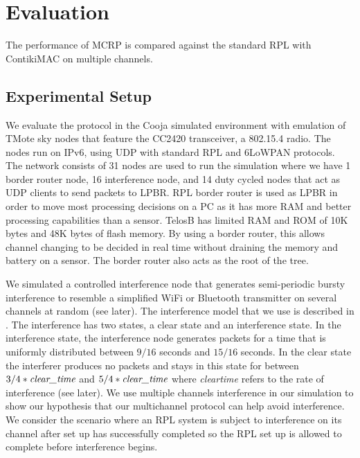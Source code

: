 \section{Evaluation}
\label{sec:evaluation}
The performance of MCRP is compared against the standard RPL with ContikiMAC on multiple channels.

\subsection{Experimental Setup}
We evaluate the protocol in the  Cooja simulated environment with emulation of TMote sky nodes that feature the CC2420 transceiver, a 802.15.4 radio. The nodes run on IPv6, using UDP with standard RPL and 6LoWPAN protocols. The network consists of 31 nodes are used to run the simulation where we have 1 border router node, 16 interference node, and 14 duty cycled nodes that act as UDP clients to send packets to LPBR. RPL border router is used as LPBR in order to move most processing decisions on a PC as it has more RAM and better processing capabilities than a sensor. TelosB has limited RAM and ROM of 10K bytes and 48K bytes of flash memory. By using a border router, this allows channel changing to be decided in real time without draining the memory and battery on a sensor. The border router also acts as the root of the tree.

We simulated a controlled interference node that generates semi-periodic bursty interference to resemble a simplified WiFi or Bluetooth transmitter on several channels at random (see later). The interference model that we use is described in \cite{Boano:2010:MSM:2127940.2127963}. The interference has two states, a clear state and an interference state. 
In the interference state, the interference node generates packets for a time that is uniformly distributed between $9/16$ seconds and $15/16$ seconds. In the clear state the interferer produces no packets and stays in this state for between $3/4 * \emph{clear\textunderscore time}$ and $5/4 * \emph{clear\textunderscore time}$ where \emph{clear\textunderscore time} refers to the rate of interference (see later).
We use multiple channels interference in our simulation to show our hypothesis that our multichannel protocol can help avoid interference. We consider the scenario where an RPL system is subject to interference on its channel after set up has successfully completed so the RPL set up is allowed to complete before interference begins.

